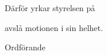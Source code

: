 \documentclass[../_main/handlingar.tex]{subfiles}
\begin{document}
\motionssvar

Därför yrkar styrelsen på

\begin{attsatser}
    \att avslå motionen i sin helhet.
\end{attsatser}

\begin{signatures}{1}
    \ist
    \signature{\ordf}{Ordförande}
\end{signatures}
\end{document}
